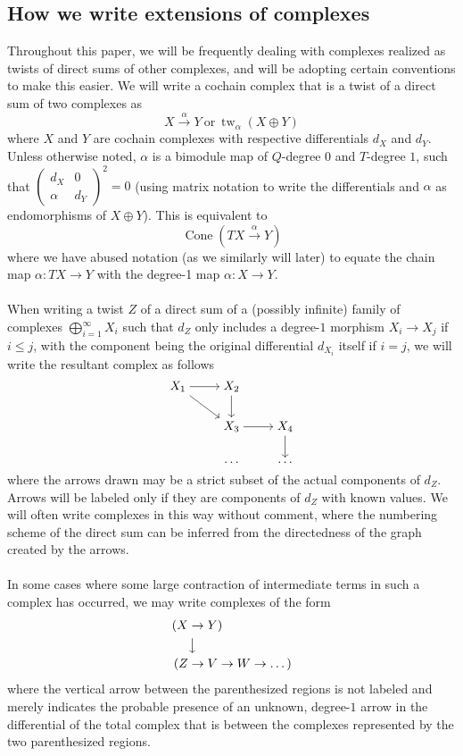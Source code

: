 \documentclass[11pt]{article}
\DeclareMathOperator{\Cone}{Cone}
\DeclareMathOperator{\tw}{tw}
\theoremstyle{definition}
\theoremstyle{remark}
\numberwithin{equation}{section}
\begin{document}
\subsection{How we write extensions of complexes}
Throughout this paper, we will be
frequently dealing with complexes realized as twists
of direct sums of other complexes, and will be adopting certain conventions to
make this easier. We will write a cochain complex that is a twist of a direct
sum of two complexes as 
\[X\xrightarrow{\alpha} Y\ \mathrm{or}\ \tw_{\alpha}(X\oplus Y)\]
where $X$ and $Y$ are cochain complexes with respective differentials
$d_X$ and $d_Y$.
Unless otherwise noted, $\alpha$ is a bimodule map of $Q$-degree $0$ and
$T$-degree $1$, such that
$\left(\begin{smallmatrix} d_X & 0 \\ \alpha & d_Y \end{smallmatrix}\right)^2=0$
(using matrix notation to write the differentials
and $\alpha$ as endomorphisms of $X\oplus Y$). This is equivalent to
\[\Cone(TX\xrightarrow{\alpha} Y)\]
where we have abused notation (as we similarly will later) to equate the chain map
$\alpha:TX\to Y$ with the degree-1 map $\alpha:X\to Y$.
\\ \\
When writing a twist $Z$ of a direct sum of a (possibly infinite) family of complexes
$\bigoplus_{i=1}^\infty X_i$ such that $d_Z$ only includes a degree-$1$ morphism
$X_i\to X_j$ if $i \leq j$, with the component being the original differential
$d_{X_i}$ itself if $i=j$, we will write the resultant complex as follows
\[\begin{tikzcd}[ampersand replacement=\&,cramped]
	{X_1} \& {X_2} \& \\
	\& {X_3} \& {X_4} \\
	\& \dots \& \dots
	\arrow[from=1-1, to=1-2]
	\arrow[from=1-1, to=2-2]
	\arrow[from=1-2, to=2-2]
	\arrow[from=2-2, to=2-3]
	\arrow[from=2-3, to=3-3]
\end{tikzcd}\]
where the arrows drawn may be a strict subset of the actual components of $d_Z$.
Arrows will be labeled only if they are components of $d_Z$ with
known values. We will often
write complexes in this way without comment, where the numbering scheme of the
direct sum can be inferred from the directedness of the graph created by the arrows.
\\ \\
In some cases where some large contraction of intermediate terms in such a complex
has occurred, we may write complexes of the form
\begin{align*}
(X &\to Y )\\
	&{\big\downarrow}\\
(Z &\to V \to W\to \dots)
\end{align*}
where the vertical arrow between the parenthesized regions is not labeled and
merely indicates the probable presence of an unknown, degree-$1$ arrow in the
differential of the total complex that is between the complexes represented by the
two parenthesized regions.
\end{document}

